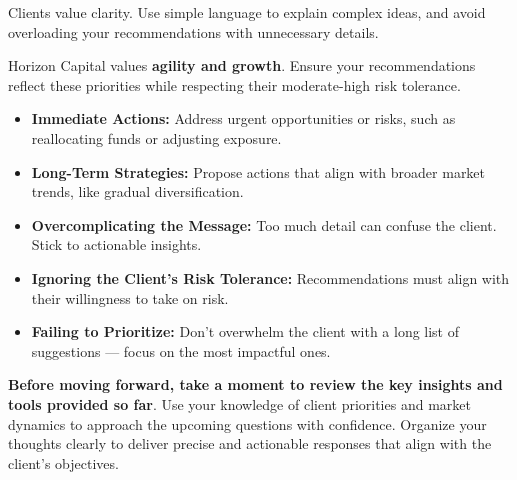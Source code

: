 \documentclass[11pt]{article}
\begin{document}

Clients value clarity. Use simple language to explain complex ideas, and avoid
overloading your recommendations with unnecessary details.

Horizon Capital values \textbf{agility and growth}. Ensure your
recommendations reflect these priorities while respecting their moderate-high
risk tolerance.

\begin{itemize}[leftmargin=1.5em, itemsep=2pt]
  \item \textbf{Immediate Actions:} Address urgent opportunities or risks, such
  as reallocating funds or adjusting exposure.
  \item \textbf{Long-Term Strategies:} Propose actions that align with broader
  market trends, like gradual diversification.
\end{itemize}



\begin{itemize}[leftmargin=1.5em, itemsep=2pt]
  \item \textbf{Overcomplicating the Message:} Too much detail can confuse the
  client. Stick to actionable insights.
  \item \textbf{Ignoring the Client's Risk Tolerance:} Recommendations must
  align with their willingness to take on risk.
  \item \textbf{Failing to Prioritize:} Don't overwhelm the client with a long
  list of suggestions --- focus on the most impactful ones.
\end{itemize}

\bigskip
\textbf{Before moving forward, take a moment to review the key insights and
tools provided so far}. Use your knowledge of client priorities and market
dynamics to approach the upcoming questions with confidence. Organize your
thoughts clearly to deliver precise and actionable responses that align with
the client's objectives.
\end{document}
